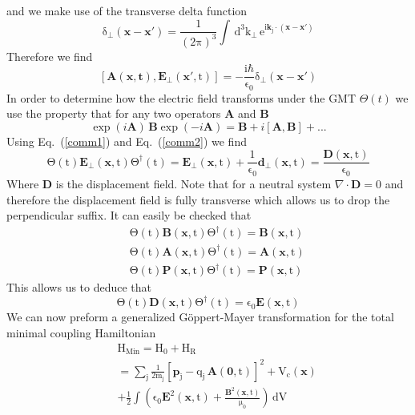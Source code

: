 \documentclass[twocolumn,english,pra,aps,superscriptaddress,floatfix]{revtex4-1}
\begin{document}
and we make use of the transverse delta function
\begin{equation}
\mathrm{\delta_{\perp}(\mathbf{x}-\mathbf{x}')=\frac{1}{(2\pi)^3}\int\,d^3k_{\perp}\,e^{i\mathbf{k}_j\cdot(\mathbf{x}-\mathbf{x}')}}
\end{equation}
Therefore we find 
\begin{equation}
\mathrm{[\mathbf{A}(\mathbf{x,t}),\mathbf{E}_{\perp}(\mathbf{x}',t)]=-\frac{i\hbar}{\epsilon_0}\delta_{\perp}(\mathbf{x}-\mathbf{x}')}
\label{comm1}
\end{equation}
In order to determine how the electric field transforms under the GMT $\Theta(t)$ we use the property that for any two operators $\mathbf{A}$ and $\mathbf{B}$
\begin{equation}
\exp{(i\mathbf{A})}\,\mathbf{B}\exp{(-i\mathbf{A})}=\mathbf{B}+i[\mathbf{A},\mathbf{B}]+...
\label{comm2}
\end{equation}
Using Eq.\ (\ref{comm1}) and Eq.\ (\ref{comm2}) we find
\begin{equation}
\mathrm{\Theta(t)\mathbf{E}_{\perp}(\mathbf{x},t)\Theta^{\dagger}(t)=\mathbf{E}_{\perp}(\mathbf{x},t)+\frac{1}{\epsilon_0}\mathbf{d}_{\perp}(\mathbf{x},t)=\frac{\mathbf{D}(\mathbf{x},t)}{\epsilon_0}}
\end{equation}
Where $\mathbf{D}$ is the displacement field.  Note that for a neutral system $\nabla\cdot\mathbf{D}=0$ and therefore the displacement field is fully transverse which allows us to drop the perpendicular suffix.
It can easily be checked that 
\begin{eqnarray}
&&\mathrm{\Theta(t)\mathbf{B}(\mathbf{x},t)\Theta^{\dagger}(t)=\mathbf{B}(\mathbf{x},t)} \\
&&\mathrm{\Theta(t)\mathbf{A}(\mathbf{x},t)\Theta^{\dagger}(t)=\mathbf{A}(\mathbf{x},t)} \\
&&\mathrm{\Theta(t)\mathbf{P}(\mathbf{x},t)\Theta^{\dagger}(t)=\mathbf{P}(\mathbf{x},t)}
\end{eqnarray}
This allows us to deduce that 
\begin{equation}
\mathrm{\Theta(t)\mathbf{D}(\mathbf{x},t)\Theta^{\dagger}(t)=\epsilon_0\mathbf{E}(\mathbf{x},t)} 
\end{equation}
We can now preform a generalized G\"{o}ppert-Mayer transformation for the total minimal coupling Hamiltonian
\begin{eqnarray}
&&\mathrm{H_{Min}=H_0+H_R}\nonumber \\
&&=\mathrm{\sum_{j}\frac{1}{2m_j}\left[\mathbf{p}_j-q_j \,\mathbf{A}(\mathbf{0},t)\right]^2+V_{c}(\mathbf{x})}\nonumber \\
&&\mathrm{+\frac{1}{2}\int\left( \epsilon_0\mathbf{E}^2(\mathbf{x},t)+\frac{\mathbf{B}^2(\mathbf{x},t)}{\mu_0}\right)\,dV}
\label{fullminimal}
\end{eqnarray}
\end{document}
